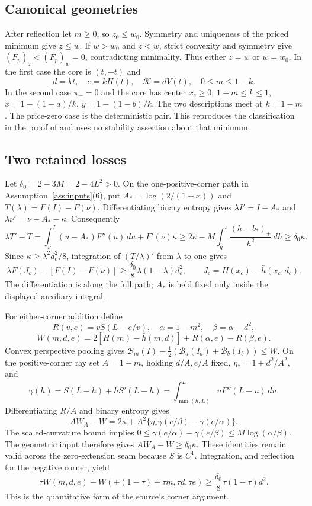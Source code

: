 \documentclass[11pt,reqno]{amsart}
\numberwithin{equation}{section}
\theoremstyle{definition}
\theoremstyle{remark}
\newcommand{\cB}{\mathcal B}
\newcommand{\cK}{\mathcal K}
\begin{document}
\subsection{Canonical geometries}
After reflection let $m\ge0$, so $z_0\le w_0$. Symmetry and uniqueness
of the priced minimum give $z\le w$. If $w>w_0$ and $z<w$, strict
convexity and symmetry give $(F_p)_z<(F_p)_w=0$, contradicting
minimality. Thus either $z=w$ or $w=w_0$. In the first case the core
is $(t,-t)$ and
\begin{equation}\label{eq:reflected}
 d=kt,\quad e=kH(t),\quad \cK=dV(t),\quad 0\le m\le1-k.
\end{equation}
In the second case $\pi_-=0$ and the core has center $x_c\ge0$;
$1-m\le k\le1$, $x=1-(1-a)/k$, $y=1-(1-b)/k$.
The two descriptions meet at $k=1-m$. The price-zero case is the
deterministic pair. This reproduces the classification in the proof of
\cite[Section 3]{OpenAI} and uses no stability assertion about that minimum.

\subsection{Two retained losses}
Let $\delta_0=2-3M=2-4L^2>0$. On the one-positive-corner path in
Assumption~\ref{ass:inputs}(6), put $A_* =\log(2/(1+x))$ and
$T(\lambda)=F(I)-F(\nu)$. Differentiating binary entropy gives
$\lambda I'=I-A_*$ and $\lambda\nu'=\nu-A_*-\kappa$.
Consequently
\[
 \lambda T'-T=\int_\nu^I(u-A_*)F''(u)\,du+F'(\nu)\kappa
 \ge2\kappa-M\int_q^s\frac{(h-b_*)_+}{h^2}\,dh
 \ge\delta_0\kappa.
\]
Since $\kappa\ge\lambda^2d_c^2/8$, integration of $(T/\lambda)'$
from $\lambda$ to one gives
\begin{equation}\label{eq:thinloss}
 \lambda F(J_c)-[F(I)-F(\nu)]
 \ge\frac{\delta_0}{8}\lambda(1-\lambda)d_c^2,
 \qquad J_c=H(x_c)-\bar h(x_c,d_c).
\end{equation}
The differentiation is along the full path; $A_*$ is held fixed only
inside the displayed auxiliary integral.

For either-corner addition define
\[
 R(v,e)=vS(L-e/v),\quad \alpha=1-m^2,\quad\beta=\alpha-d^2,
 \]
\[
 W(m,d,e)=2[H(m)-\bar h(m,d)]+R(\alpha,e)-R(\beta,e).
\]
Convex perspective pooling gives
$\cB_m(I)-\tfrac12(\cB_a(I_a)+\cB_b(I_b))\le W$.
On the positive-corner ray set $A=1-m$, holding $d/A,e/A$ fixed,
$\eta_*=1+d^2/A^2$, and
\[
 \gamma(h)=S(L-h)+hS'(L-h)
 =\int_{\min(h,L)}^L uF''(L-u)\,du.
\]
Differentiating $R/A$ and binary entropy gives
\[
 A W_A-W=2\kappa+A^2\{\eta_*\gamma(e/\beta)-\gamma(e/\alpha)\}.
\]
The scaled-curvature bound implies
$0\le\gamma(e/\alpha)-\gamma(e/\beta)\le M\log(\alpha/\beta)$.
The geometric input therefore gives $AW_A-W\ge\delta_0\kappa$.
These identities remain valid across the zero-extension seam because
$S$ is $C^1$. Integration, and reflection for the negative corner, yield
\begin{equation}\label{eq:reserveloss}
 \tau W(m,d,e)-W(\pm(1-\tau)+\tau m,\tau d,\tau e)
 \ge\frac{\delta_0}{8}\tau(1-\tau)d^2.
\end{equation}
This is the quantitative form of the source's corner argument.
\end{document}
